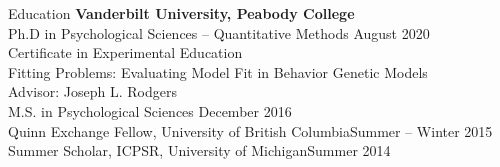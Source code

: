 \begin{rSection}{\textrm{Education}}
{\bf Vanderbilt University, Peabody College}\\
Ph.D in Psychological Sciences -- Quantitative Methods \hfill{August 2020}\\%
\hspace*{\pindent}Certificate in Experimental Education\\%
\hspace*{\pindent}Fitting Problems: Evaluating Model Fit in Behavior Genetic Models\\
\hspace*{\pindent}Advisor: Joseph L. Rodgers%
\smallskip\\
M.S. in Psychological Sciences \hfill{December 2016} \\
\hspace*{\pindent}Quinn Exchange Fellow, University of British Columbia\hfill{Summer – Winter 2015}\\
\hspace*{\pindent}Summer Scholar, ICPSR, University of Michigan\hfill{Summer 2014}%
\medskip\\
\begin{comment}
\textbf{University of British Columbia}\\
Visiting International Researcher \& Quinn Exchange Fellow\hfill{Summer – Winter 2015}\\
\hspace*{\pindent}Department of Psychology\\
\hspace*{\pindent}Sponsor: Jeremy C. Biesanz \& Anita DeLongis\medskip\\
\textbf{University of Michigan, Ann Arbor}\\

\end{comment}
\end{rSection}
